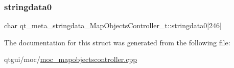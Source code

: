 \subsubsection{\texorpdfstring{stringdata0}{stringdata0}}
{\footnotesize\ttfamily char qt\+\_\+meta\+\_\+stringdata\+\_\+\+Map\+Objects\+Controller\+\_\+t\+::stringdata0\mbox{[}246\mbox{]}}



The documentation for this struct was generated from the following file\+:\begin{DoxyCompactItemize}
\item 
qtgui/moc/\mbox{\hyperlink{moc__mapobjectscontroller_8cpp}{moc\+\_\+mapobjectscontroller.\+cpp}}\end{DoxyCompactItemize}
